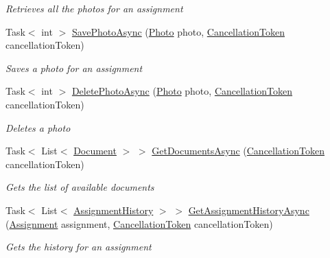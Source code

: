 \begin{DoxyCompactItemize}
\begin{DoxyCompactList}\small\item\em Retrieves all the photos for an assignment \end{DoxyCompactList}\item 
Task$<$ int $>$ \hyperlink{class_field_service_1_1_tests_1_1_mocks_1_1_mock_assignment_service_a10c72c1dc0eb6bb55f1af7f6b8dfee06}{Save\+Photo\+Async} (\hyperlink{class_field_service_1_1_data_1_1_photo}{Photo} photo, \hyperlink{_view_models_2_assignment_view_model_8cs_aba80ec766846c61f55644fd23860cb18}{Cancellation\+Token} cancellation\+Token)
\begin{DoxyCompactList}\small\item\em Saves a photo for an assignment \end{DoxyCompactList}\item 
Task$<$ int $>$ \hyperlink{class_field_service_1_1_tests_1_1_mocks_1_1_mock_assignment_service_ac32f98da0406ef3ac0173dcd80d97082}{Delete\+Photo\+Async} (\hyperlink{class_field_service_1_1_data_1_1_photo}{Photo} photo, \hyperlink{_view_models_2_assignment_view_model_8cs_aba80ec766846c61f55644fd23860cb18}{Cancellation\+Token} cancellation\+Token)
\begin{DoxyCompactList}\small\item\em Deletes a photo \end{DoxyCompactList}\item 
Task$<$ List$<$ \hyperlink{class_field_service_1_1_data_1_1_document}{Document} $>$ $>$ \hyperlink{class_field_service_1_1_tests_1_1_mocks_1_1_mock_assignment_service_a0885f03ffa0da48989293db59983b651}{Get\+Documents\+Async} (\hyperlink{_view_models_2_assignment_view_model_8cs_aba80ec766846c61f55644fd23860cb18}{Cancellation\+Token} cancellation\+Token)
\begin{DoxyCompactList}\small\item\em Gets the list of available documents \end{DoxyCompactList}\item 
Task$<$ List$<$ \hyperlink{class_field_service_1_1_data_1_1_assignment_history}{Assignment\+History} $>$ $>$ \hyperlink{class_field_service_1_1_tests_1_1_mocks_1_1_mock_assignment_service_ad24c1e0a33fcb1e6a08b88bf541f8f91}{Get\+Assignment\+History\+Async} (\hyperlink{class_field_service_1_1_data_1_1_assignment}{Assignment} assignment, \hyperlink{_view_models_2_assignment_view_model_8cs_aba80ec766846c61f55644fd23860cb18}{Cancellation\+Token} cancellation\+Token)
\begin{DoxyCompactList}\small\item\em Gets the history for an assignment \end{DoxyCompactList}\item 

\end{DoxyCompactItemize}
